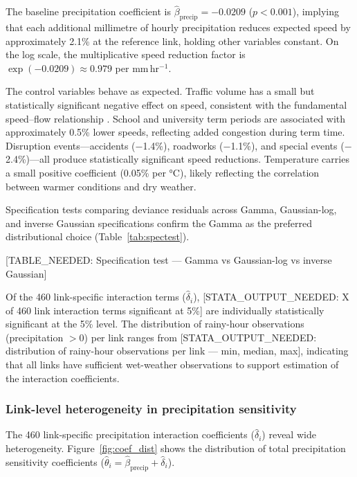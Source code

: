 \documentclass[review]{elsarticle}
\begin{document}
The baseline precipitation coefficient is $\hat{\beta}_{\text{precip}} = -0.0209$ ($p < 0.001$), implying that each additional millimetre of hourly precipitation reduces expected speed by approximately 2.1\% at the reference link, holding other variables constant. On the log scale, the multiplicative speed reduction factor is $\exp(-0.0209) \approx 0.979$ per mm\,hr$^{-1}$.

The control variables behave as expected. Traffic volume has a small but statistically significant negative effect on speed, consistent with the fundamental speed--flow relationship \citep{greenshields1935study}. School and university term periods are associated with approximately 0.5\% lower speeds, reflecting added congestion during term time. Disruption events---accidents ($-$1.4\%), roadworks ($-$1.1\%), and special events ($-$2.4\%)---all produce statistically significant speed reductions. Temperature carries a small positive coefficient (0.05\% per \si{\degreeCelsius}), likely reflecting the correlation between warmer conditions and dry weather.

Specification tests comparing deviance residuals across Gamma, Gaussian-log, and inverse Gaussian specifications confirm the Gamma as the preferred distributional choice (Table~\ref{tab:spectest}).

\begin{table}[htbp]
\centering
\caption{Distributional specification tests: Gamma vs.\ alternative GLM families}
\label{tab:spectest}
[TABLE\_NEEDED: Specification test --- Gamma vs Gaussian-log vs inverse Gaussian]
\end{table}

Of the 460 link-specific interaction terms ($\hat{\delta}_i$), [STATA\_OUTPUT\_NEEDED: X of 460 link interaction terms significant at 5\%] are individually statistically significant at the 5\% level. The distribution of rainy-hour observations (precipitation $> 0$) per link ranges from [STATA\_OUTPUT\_NEEDED: distribution of rainy-hour observations per link --- min, median, max], indicating that all links have sufficient wet-weather observations to support estimation of the interaction coefficients.

\subsubsection{Link-level heterogeneity in precipitation sensitivity}

The 460 link-specific precipitation interaction coefficients ($\hat{\delta}_i$) reveal wide heterogeneity. Figure~\ref{fig:coef_dist} shows the distribution of total precipitation sensitivity coefficients ($\hat{\theta}_i = \hat{\beta}_{\text{precip}} + \hat{\delta}_i$).
\end{document}
